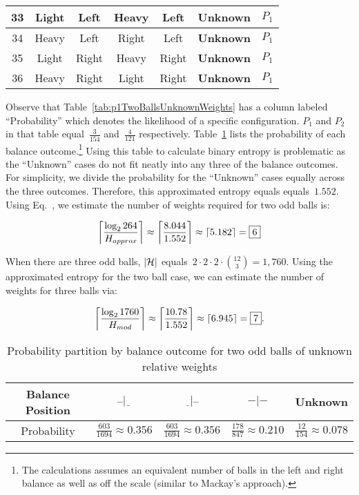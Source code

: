\begin{table}
\begin{tabular}{|c||c|c||c|c||c||c|}
      33  &  Light   &  Left     &  Heavy   &  Left    &  \textbf{Unknown} & $P_{1}$ \\ \hline
      34  &  Heavy   &  Left     &  Right   &  Left    &  \textbf{Unknown} & $P_{1}$ \\ \hline
      35  &  Light   &  Right    &  Heavy   &  Right   &  \textbf{Unknown} & $P_{1}$ \\ \hline
      36  &  Heavy   &  Right    &  Light   &  Right   &  \textbf{Unknown} & $P_{1}$ \\ \hline
    \end{tabular}
  \end{table}

  
  \noindent
  Observe that Table~\ref{tab:p1TwoBallsUnknownWeights} has a column labeled ``Probability'' which denotes the likelihood of a specific configuration.  $P_{1}$ and $P_{2}$ in that table equal~$\frac{3}{154}$ and~$\frac{4}{121}$ respectively.  Table~\ref{tab:twoBallProbabilityBreakdown} lists the probability of each balance outcome.\footnote{The calculations assumes an equivalent number of balls in the left and right balance as well as off the scale (similar to Mackay's approach).}  Using this table to calculate binary entropy is problematic as the ``Unknown'' cases do not fit neatly into any three of the balance outcomes.  For simplicity, we divide the probability for the ``Unknown'' cases equally across the three outcomes.  Therefore, this approximated entropy equals equals~$1.552$.   Using Eq.~, we estimate the number of weights required for two odd balls is:
  
  \[ \ceil*{\frac{\log_{2} 264}{H_{approx}}} \approx \ceil*{\frac{8.044}{1.552}} \approx \ceil*{5.182} = \boxed{6} \]
  
  When there are three odd balls, $\abs{\mathcal{H}}$ equals~${2\cdot2\cdot2\cdot\binom{12}{3} = 1,760}$.  Using the approximated entropy for the two ball case, we can estimate the number of weights for three balls via:
  
  \[ \ceil*{\frac{\log_{2} 1760}{H_{mod}}} \approx \ceil*{\frac{10.78}{1.552}} \approx \ceil*{6.945} = \boxed{7} \text{.}\]

  \begin{table}
    \centering
    \caption{Probability partition by balance outcome for two odd balls of unknown relative weights}\label{tab:twoBallProbabilityBreakdown}
    \begin{tabular}{|c||c|c|c|c|}
      \hline
      Balance Position & $\bar{~}\bar{~}|\underline{~~}$  & $\underline{~~}|\bar{~}\bar{~}$  & $-|-$ & Unknown \\\hline
      Probability      & $\frac{603}{1694} \approx 0.356$ & $\frac{603}{1694} \approx 0.356$ & $\frac{178}{847} \approx 0.210$ & $\frac{12}{154} \approx 0.078$    \\\hline
    \end{tabular}
  \end{table}


